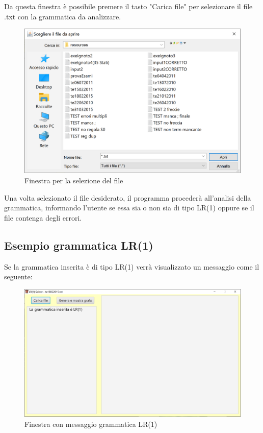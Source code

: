 \documentclass[12pt]{article}
\begin{document}
Da questa finestra è possibile premere il tasto "Carica file" per selezionare il file .txt con la grammatica da analizzare.
\begin{figure}[h!]
\centering
\includegraphics[scale=0.6]{immagini/SelezioneLinguaggio.png}
\caption{Finestra per la selezione del file}
\end{figure}

Una volta selezionato il file desiderato, il programma procederà all'analisi della grammatica, informando l'utente se essa sia o non sia di tipo LR(1) oppure se il file contenga degli errori.
\pagebreak

\subsection{Esempio grammatica LR(1)}
Se la grammatica inserita è di tipo LR(1) verrà visualizzato un messaggio come il seguente:
\begin{figure}[h!]
\centering
\includegraphics[scale=0.5]{immagini/GrammaticaLR1.png}
\caption{Finestra con messaggio grammatica LR(1)}
\end{figure}
\end{document}
